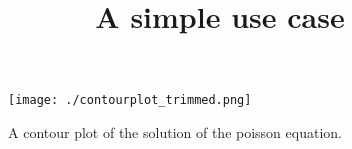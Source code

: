 \documentclass[12pt]{article}
\title{A simple use case}
\begin{document}
\maketitle

\begin{figure}[htb]
	\centering
	\texttt{[image: ./contourplot\_trimmed.png]}
	\caption{A contour plot of the solution of the poisson equation.}%
	\label{fig:contourplot}
\end{figure}
\end{document}
